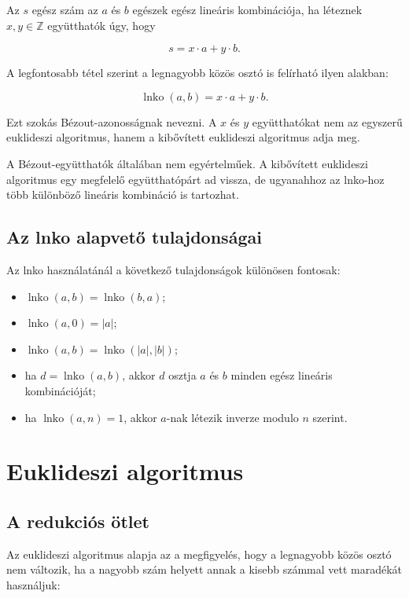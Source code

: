 Az $s$ egész szám az $a$ és $b$ egészek egész lineáris kombinációja, ha léteznek $x,y\in\mathbb{Z}$ együtthatók úgy, hogy

\[
s=x\cdot a+y\cdot b.
\]

A legfontosabb tétel szerint a legnagyobb közös osztó is felírható ilyen alakban:

\[
\operatorname{lnko}(a,b)=x\cdot a+y\cdot b.
\]

Ezt szokás Bézout-azonosságnak nevezni. A $x$ és $y$ együtthatókat nem az egyszerű euklideszi algoritmus, hanem a kibővített euklideszi algoritmus adja meg.

\begin{warningbox}
A Bézout-együtthatók általában nem egyértelműek. A kibővített euklideszi algoritmus egy megfelelő együtthatópárt ad vissza, de ugyanahhoz az lnko-hoz több különböző lineáris kombináció is tartozhat.
\end{warningbox}

\subsection{Az lnko alapvető tulajdonságai}

Az lnko használatánál a következő tulajdonságok különösen fontosak:

\begin{itemize}
  \item $\operatorname{lnko}(a,b)=\operatorname{lnko}(b,a)$;
  \item $\operatorname{lnko}(a,0)=|a|$;
  \item $\operatorname{lnko}(a,b)=\operatorname{lnko}(|a|,|b|)$;
  \item ha $d=\operatorname{lnko}(a,b)$, akkor $d$ osztja $a$ és $b$ minden egész lineáris kombinációját;
  \item ha $\operatorname{lnko}(a,n)=1$, akkor $a$-nak létezik inverze modulo $n$ szerint.
\end{itemize}

\section{Euklideszi algoritmus}

\subsection{A redukciós ötlet}

Az euklideszi algoritmus alapja az a megfigyelés, hogy a legnagyobb közös osztó nem változik, ha a nagyobb szám helyett annak a kisebb számmal vett maradékát használjuk:

